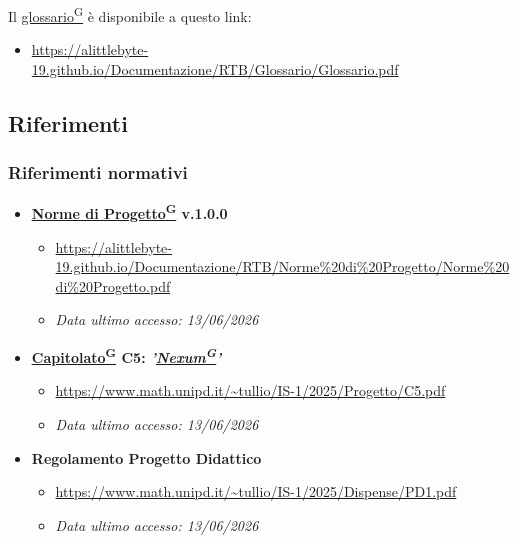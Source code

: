 \documentclass[a4paper,12pt]{article}
\providecommand{\glslink}[2]{\href{https://alittlebyte-19.github.io/Documentazione/glossario.html\#gls-#1}{\underline{#2}\textsuperscript{\scriptsize G}}}
\begin{document}
Il \glslink{glossario}{glossario} è disponibile a questo link:
\begin{itemize}
    \item \url{https://alittlebyte-19.github.io/Documentazione/RTB/Glossario/Glossario.pdf}
\end{itemize}

\subsection{Riferimenti}
\label{sec:riferimenti}
\subsubsection{Riferimenti normativi}
\begin{itemize}
    \item \textbf{\glslink{norme-di-progetto}{Norme di Progetto} v.1.0.0}
    \begin{itemize}
        \item \url{https://alittlebyte-19.github.io/Documentazione/RTB/Norme%20di%20Progetto/Norme%20di%20Progetto.pdf}
        \item \textit{Data ultimo accesso: 13/06/2026} 
    \end{itemize}
    \item \textbf{\glslink{capitolato}{Capitolato} C5: \textit{\textbf{'\glslink{nexum}{Nexum}'}}}
    \begin{itemize}
        \item \url{https://www.math.unipd.it/~tullio/IS-1/2025/Progetto/C5.pdf}
        \item \textit{Data ultimo accesso: 13/06/2026}
    \end{itemize}
     \item \textbf{Regolamento Progetto Didattico}
    \begin{itemize}
        \item \url{https://www.math.unipd.it/~tullio/IS-1/2025/Dispense/PD1.pdf}
        \item \textit{Data ultimo accesso: 13/06/2026}
    \end{itemize}
   
\end{itemize}
\end{document}
